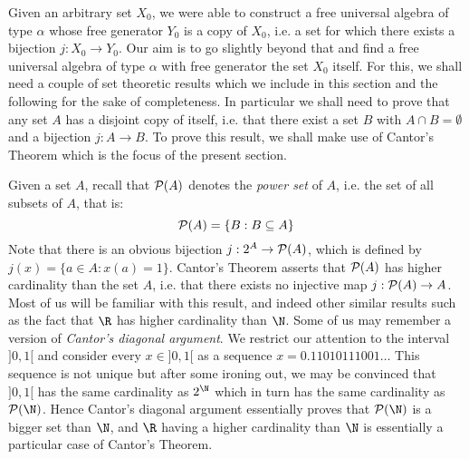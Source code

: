 Given an arbitrary set $X_{0}$, we were able to
construct a free universal algebra of type $\alpha$ whose free generator $Y_{0}$
is a copy of $X_{0}$, i.e. a set for which there exists a bijection $j:X_{0}\to
Y_{0}$. Our aim is to go slightly beyond that and find a free universal algebra of
type $\alpha$ with free generator the set $X_{0}$ itself. For this, we shall need
a couple of set theoretic results which we include in this section and the
following for the sake of completeness. In particular we shall need to prove that
any set $A$ has a disjoint copy of itself, i.e. that there exist a set $B$ with
$A\cap B=\emptyset$ and a bijection $j:A\to B$. To prove this result, we shall
make use of Cantor's Theorem which is the focus of the present section.

Given a set $A$, recall that ${\cal P}(A)$ denotes the {\em power set} of $A$,
i.e. the set of all subsets of $A$, that is:
    \[
    {\cal P}(A) = \{B: B\subseteq A\}
    \]
Note that there is an obvious bijection $j:2^{A}\to{\cal P}(A)$, which is defined
by $j(x)=\{a\in A:x(a)=1\}$. Cantor's Theorem asserts that ${\cal P}(A)$ has
higher cardinality than the set $A$, i.e. that there exists no injective map
$j:{\cal P}(A)\to A$. Most of us will be familiar with this result, and indeed
other similar results such as the fact that $\R$ has higher cardinality than $\N$.
Some of us may remember a version of {\em Cantor's diagonal argument}. We restrict
our attention to the interval $]0,1[$ and consider every $x\in ]0,1[$ as a
sequence $x = 0.11010111001\ldots$ This sequence is not unique but after some
ironing out, we may be convinced that $]0,1[$ has the same cardinality as $2^{\N}$
which in turn has the same cardinality as ${\cal P}(\N)$. Hence Cantor's diagonal
argument essentially proves that ${\cal P}(\N)$ is a bigger set than $\N$, and
$\R$ having a higher cardinality than $\N$ is essentially a particular case of
Cantor's Theorem.


